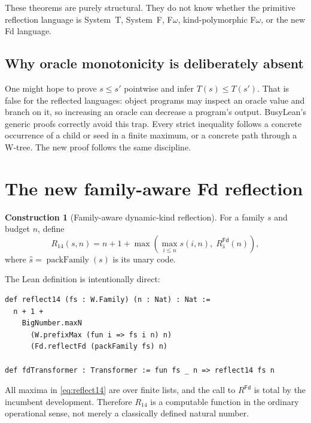\documentclass[11pt]{article}
\theoremstyle{definition}
\newtheorem{construction}[theorem]{Construction}
\theoremstyle{remark}
\newcommand{\Fd}{\mathsf{Fd}}
\begin{document}
These theorems are purely structural.  They do not know whether the primitive
reflection language is System~T, System~F, F$\omega$, kind-polymorphic
F$\omega$, or the new Fd language.

\subsection{Why oracle monotonicity is deliberately absent}

One might hope to prove $s\le s'$ pointwise and infer $T(s)\le T(s')$.  That is
false for the reflected languages: object programs may inspect an oracle value
and branch on it, so increasing an oracle can decrease a program's output.
BusyLean's generic proofs correctly avoid this trap.  Every strict inequality
follows a concrete occurrence of a child or seed in a finite maximum, or a
concrete path through a W-tree.  The new proof follows the same discipline.

\section{The new family-aware Fd reflection}

\begin{construction}[Family-aware dynamic-kind reflection]\label{con:reflect14}
For a family $s$ and budget $n$, define
\begin{equation}\label{eq:reflect14}
  R_{14}(s,n)=n+1+\max\left(
    \max_{i\le n}s(i,n),\;R^{\Fd}_{\widehat{s}}(n)
  \right),
\end{equation}
where $\widehat{s}=\operatorname{packFamily}(s)$ is its unary code.
\end{construction}

The Lean definition is intentionally direct:
\begin{lstlisting}
def reflect14 (fs : W.Family) (n : Nat) : Nat :=
  n + 1 +
    BigNumber.maxN
      (W.prefixMax (fun i => fs i n) n)
      (Fd.reflectFd (packFamily fs) n)

def fdTransformer : Transformer := fun fs _ n => reflect14 fs n
\end{lstlisting}

All maxima in \eqref{eq:reflect14} are over finite lists, and the call to
$R^{\Fd}$ is total by the incumbent development.  Therefore $R_{14}$ is a
computable function in the ordinary operational sense, not merely a classically
defined natural number.
\end{document}
